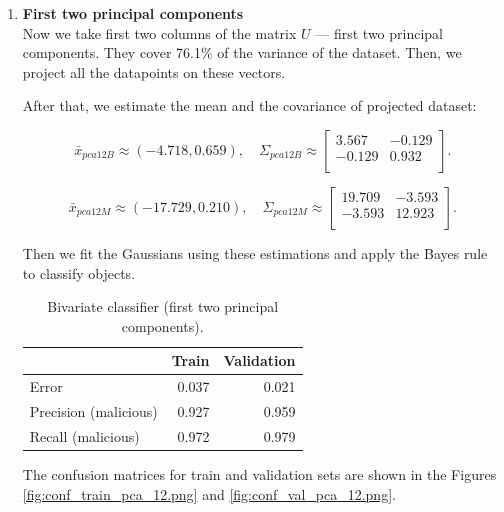 \documentclass[11pt,a4paper]{article}
\begin{document}
\begin{enumerate}
\begin{enumerate}
	\item \textbf {First two principal components} \\
	Now we take first two columns of the matrix $U$ --- first two principal components. They cover 76.1\% of the variance of the dataset. Then, we project all the datapoints on these vectors.
	
	After that, we estimate the mean and the covariance of projected dataset:
	
	\[
	\bar{x}_{pca12B} \approx (-4.718,  0.659), \quad 
	\Sigma_{pca12B} \approx 
	\begin{bmatrix}
	3.567 & -0.129   \\
	-0.129 & 0.932   \\
	\end{bmatrix}.
	\]
	
	\[
	\bar{x}_{pca12M} \approx (-17.729,  0.210), \quad 
	\Sigma_{pca12M} \approx 
	\begin{bmatrix}
	19.709 & -3.593  \\
	-3.593 & 12.923   \\
	\end{bmatrix}.
	\]
	
	
	Then we fit the Gaussians using these estimations and apply the Bayes rule to classify objects.

	
	\begin{table}[H]
		\centering
		\begin{tabular}{lrr}
			\toprule
			& \textbf{Train} & \textbf{Validation}  \\ \midrule
			Error & 0.037 & 0.021 \\	
			Precision (malicious) & 0.927 & 0.959 \\
			Recall (malicious) & 0.972 & 0.979 \\
			\bottomrule
		\end{tabular}
		\caption{Bivariate classifier (first two principal components).}
		\label{tab:results-pca-12}
	\end{table}
	
	The confusion matrices for train and validation sets are shown in the Figures \ref{fig:conf_train_pca_12.png} and \ref{fig:conf_val_pca_12.png}.
	

\end{enumerate}
\end{enumerate}
\end{document}

